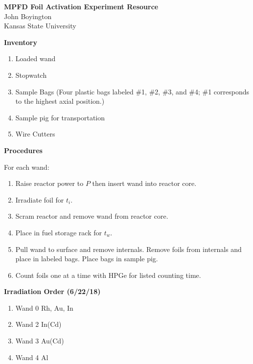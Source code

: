 \documentclass[a4paper, 11pt]{article}
\begin{document}
\thispagestyle{empty}
\noindent
\large\textbf{MPFD Foil Activation Experiment Resource} \\
\hfill John Boyington \\
\hfill Kansas State University \\

\vspace{0.005\textheight}



\noindent
{\bf Inventory}
\begin{enumerate}
 \item Loaded wand
 \item Stopwatch
 \item Sample Bags (Four plastic bags labeled \#1, \#2, \#3, and \#4; \#1 corresponds to the highest axial position.)
 \item Sample pig for transportation
 \item Wire Cutters
\end{enumerate}

\noindent
{\bf Procedures}

\noindent
For each wand:

\begin{enumerate}
 \item Raise reactor power to $P$ then insert wand into reactor core.
 \item Irradiate foil for $t_{i}$.
 \item Scram reactor and remove wand from reactor core.
 \item Place in fuel storage rack for $t_{w}$.
 \item Pull wand to surface and remove internals. Remove foils from internals and place in labeled bags. Place bags in sample pig.
 \item Count foils one at a time with HPGe for listed counting time.
\end{enumerate}

\noindent
{\bf Irradiation Order (6/22/18)}
\begin{enumerate}
 \item Wand 0  Rh, Au, In
 \item Wand 2  In(Cd)
 \item Wand 3  Au(Cd)
 \item Wand 4  Al
\end{enumerate}
\end{document}
